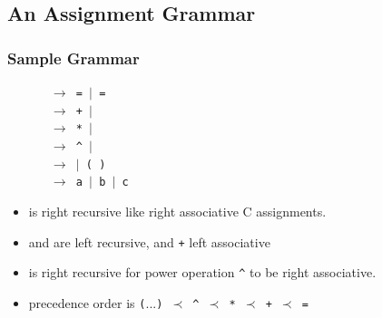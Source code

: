 \subsection{An Assignment Grammar}
\begin{frame}
\frametitle{Sample Grammar}
{\scriptsize
~~~~~ \texttt{ $\rightarrow$  =  $\mid$  = }\\
~~~~~ \texttt{ $\rightarrow$  +  $\mid$ }\\
~~~~~ \texttt{ $\rightarrow$  *  $\mid$ }\\
~~~~~ \texttt{ $\rightarrow$  \lstinline'^'  $\mid$ }\\
~~~~~ \texttt{ $\rightarrow$  $\mid$ (  ) } \\
~~~~~ \texttt{ $\rightarrow$ a $\mid$ b $\mid$ c} \\[1cm]

\begin{itemize}
\item {} is right recursive like right associative C assignments.
\item {} and  are left recursive, {\tt *} and {\tt +} left 
	associative
\item {} is right recursive for power operation \lstinline{^}
	to be right associative.
\item precedence order is {\tt ($...$) $\prec$ \lstinline!^! $\prec$ * 
	$\prec$  + $\prec$ =}
\end{itemize}
}
\end{frame}

